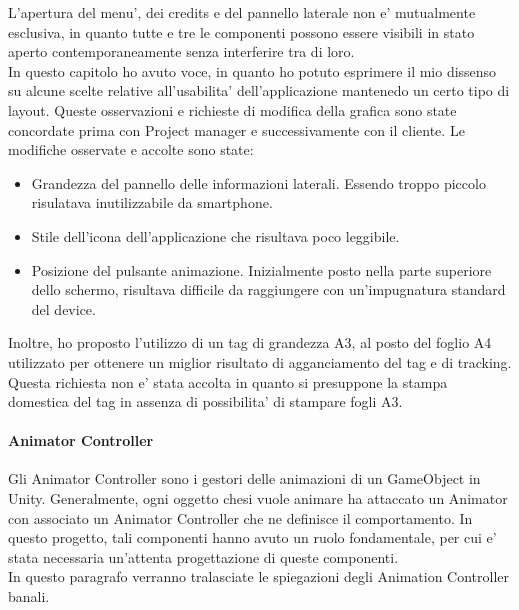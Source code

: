 L'apertura del menu', dei credits e del pannello laterale non e' mutualmente esclusiva, in quanto tutte e tre le componenti possono essere visibili in stato aperto contemporaneamente senza interferire tra di loro.\\


In questo capitolo ho avuto voce, in quanto ho potuto esprimere il mio dissenso su alcune scelte relative all'usabilita' dell'applicazione mantenedo un certo tipo di layout. Queste osservazioni e richieste di modifica della grafica sono state concordate prima con Project manager e successivamente con il cliente. Le modifiche osservate e accolte sono state:

\begin{itemize}
	\item Grandezza del pannello delle informazioni laterali. Essendo troppo piccolo risulatava inutilizzabile da smartphone.
	\item Stile dell'icona dell'applicazione che risultava poco leggibile.
	\item Posizione del pulsante animazione. Inizialmente posto nella parte superiore dello schermo, risultava difficile da raggiungere con un'impugnatura standard del device.
\end{itemize}

Inoltre, ho proposto l'utilizzo di un tag di grandezza A3, al posto del foglio A4 utilizzato per ottenere un miglior risultato di agganciamento del tag e di tracking. Questa richiesta non e' stata accolta in quanto si presuppone la stampa domestica del tag in assenza di possibilita' di stampare fogli A3.\\


\paragraph{Animator Controller}
Gli Animator Controller sono i gestori delle animazioni di un GameObject in Unity. Generalmente, ogni oggetto chesi vuole animare ha attaccato un Animator con associato un Animator Controller che ne definisce il comportamento. In questo progetto, tali componenti hanno avuto un ruolo fondamentale, per cui e' stata necessaria un'attenta progettazione di queste componenti.\\
In questo paragrafo verranno tralasciate le spiegazioni degli Animation Controller banali.\\


